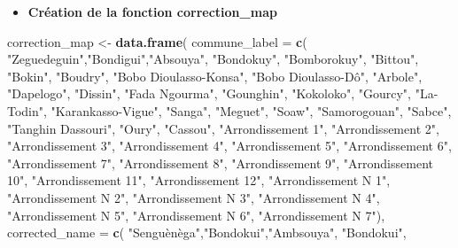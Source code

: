 \documentclass[
]{article}
\newenvironment{Shaded}{\begin{snugshade}}{\end{snugshade}}
\newcommand{\AttributeTok}[1]{\textcolor[rgb]{0.13,0.29,0.53}{#1}}
\newcommand{\FunctionTok}[1]{\textcolor[rgb]{0.13,0.29,0.53}{\textbf{#1}}}
\newcommand{\NormalTok}[1]{#1}
\newcommand{\OtherTok}[1]{\textcolor[rgb]{0.56,0.35,0.01}{#1}}
\newcommand{\StringTok}[1]{\textcolor[rgb]{0.31,0.60,0.02}{#1}}
\providecommand{\tightlist}{%
  \setlength{\itemsep}{0pt}\setlength{\parskip}{0pt}}
\begin{document}
\begin{itemize}
\tightlist
\item
  \textbf{Création de la fonction correction\_map}
\end{itemize}

\begin{Shaded}
\begin{Highlighting}[]
\NormalTok{correction\_map }\OtherTok{\textless{}{-}} \FunctionTok{data.frame}\NormalTok{(}
  \AttributeTok{commune\_label =} \FunctionTok{c}\NormalTok{(}
    \StringTok{"Zeguedeguin"}\NormalTok{,}\StringTok{"Bondigui"}\NormalTok{,}\StringTok{"Absouya"}\NormalTok{, }\StringTok{"Bondokuy"}\NormalTok{, }
    \StringTok{"Bomborokuy"}\NormalTok{, }\StringTok{"Bittou"}\NormalTok{, }\StringTok{"Bokin"}\NormalTok{, }\StringTok{"Boudry"}\NormalTok{,}
    \StringTok{"Bobo Dioulasso{-}Konsa"}\NormalTok{, }\StringTok{"Bobo Dioulasso{-}Dô"}\NormalTok{, }\StringTok{"Arbole"}\NormalTok{, }
    \StringTok{"Dapelogo"}\NormalTok{, }\StringTok{"Dissin"}\NormalTok{, }\StringTok{"Fada N\textquotesingle{}gourma"}\NormalTok{, }\StringTok{"Gounghin"}\NormalTok{,}
    \StringTok{"Kokoloko"}\NormalTok{, }\StringTok{"Gourcy"}\NormalTok{, }\StringTok{"La{-}Todin"}\NormalTok{, }\StringTok{"Karankasso{-}Vigue"}\NormalTok{,}
    \StringTok{"Sanga"}\NormalTok{, }\StringTok{"Meguet"}\NormalTok{, }\StringTok{"Soaw"}\NormalTok{, }\StringTok{"Samorogouan"}\NormalTok{, }\StringTok{"Sabce"}\NormalTok{,}
    \StringTok{"Tanghin Dassouri"}\NormalTok{, }\StringTok{"Oury"}\NormalTok{, }\StringTok{"Cassou"}\NormalTok{,}
    \StringTok{"Arrondissement 1"}\NormalTok{, }\StringTok{"Arrondissement 2"}\NormalTok{,}
    \StringTok{"Arrondissement 3"}\NormalTok{, }\StringTok{"Arrondissement 4"}\NormalTok{,}
    \StringTok{"Arrondissement 5"}\NormalTok{, }\StringTok{"Arrondissement 6"}\NormalTok{,}
    \StringTok{"Arrondissement 7"}\NormalTok{, }\StringTok{"Arrondissement 8"}\NormalTok{,}
    \StringTok{"Arrondissement 9"}\NormalTok{, }\StringTok{"Arrondissement 10"}\NormalTok{,}
    \StringTok{"Arrondissement 11"}\NormalTok{, }\StringTok{"Arrondissement 12"}\NormalTok{,}
    \StringTok{"Arrondissement N 1"}\NormalTok{, }\StringTok{"Arrondissement N 2"}\NormalTok{,}
    \StringTok{"Arrondissement N 3"}\NormalTok{, }\StringTok{"Arrondissement N 4"}\NormalTok{,}
    \StringTok{"Arrondissement N 5"}\NormalTok{, }\StringTok{"Arrondissement N 6"}\NormalTok{,}
    \StringTok{"Arrondissement N 7"}\NormalTok{),}
  \AttributeTok{corrected\_name =} \FunctionTok{c}\NormalTok{(}
    \StringTok{"Senguènèga"}\NormalTok{,}\StringTok{"Bondokui"}\NormalTok{,}\StringTok{"Ambsouya"}\NormalTok{, }\StringTok{"Bondokui"}\NormalTok{, }

\end{Highlighting}
\end{Shaded}
\end{document}
